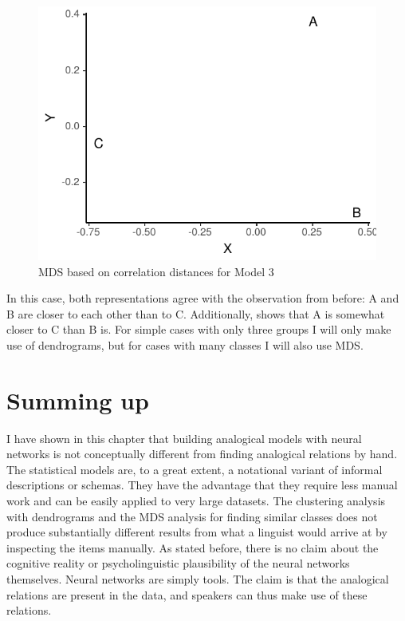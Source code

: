 \begin{figure}[!htpb]
  \centering
  \includegraphics{./figures/fake/mds3.pdf}
  \caption{MDS based on correlation distances for Model 3}\label{fig:mds-model3}
\end{figure}

In this case, both representations agree with the observation from before: A and B are closer to each other than to C. Additionally,  shows that A is somewhat closer to C than B is. For simple cases with only three groups I will only make use of dendrograms, but for cases with many classes I will also use MDS.

\section{Summing up}

I have shown in this chapter that building analogical models with neural networks is not conceptually different from finding analogical relations by hand. The statistical models are, to a great extent, a notational variant of informal descriptions or schemas. They have the advantage that they require less manual work and can be easily applied to very large datasets. The clustering analysis with dendrograms and the MDS analysis for finding similar classes does not produce substantially different results from what a linguist would arrive at by inspecting the items manually. As stated before, there is no claim about the cognitive reality or psycholinguistic plausibility of the neural networks themselves. Neural networks are simply tools. The claim is that the analogical relations are present in the data, and speakers can thus make use of these relations.

